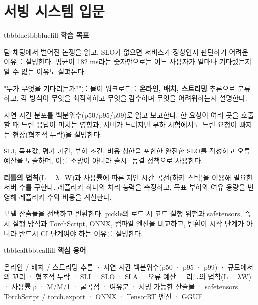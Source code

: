 \setcounter{chapter}{6}
\chapter{서빙 시스템 입문}

\begin{calloutbox}{tbbblue}{tbbbluefill}
{\normalsize\bfseries\color{tbbblue}학습 목표}\par\vspace{3pt}
\begin{tbbitemize}
  \item 팀 채팅에서 벌어진 논쟁을 읽고, SLO가 없으면 서비스가 정상인지 판단하기 어려운 이유를 설명한다. 평균이 182 ms라는 숫자만으로는 어느 사용자가 얼마나 기다렸는지 알 수 없는 이유도 살펴본다.
  \item "누가 무엇을 기다리는가?"를 물어 워크로드를 \textbf{온라인, 배치, 스트리밍} 추론으로 분류하고, 각 방식이 무엇을 최적화하고 무엇을 감수하며 무엇을 어려워하는지 설명한다.
  \item 지연 시간 분포를 백분위수(p50/p95/p99)로 읽고 보고한다. 한 요청이 여러 곳을 호출할 때 느린 응답이 미치는 영향과, 서버가 느려지면 부하 시험에서도 느린 요청이 빠지는 현상(협조적 누락)을 설명한다.
  \item SLI, 목표값, 평가 기간, 부하 조건, 비용 상한을 포함한 완전한 SLO를 작성하고 오류 예산을 도출하며, 이를 소망이 아니라 출시·동결 정책으로 사용한다.
  \item \textbf{리틀의 법칙}(L = λ·W)과 사용률에 따른 지연 시간 곡선(하키 스틱)을 이용해 필요한 서버 수를 구한다. 레플리카 하나의 처리 능력을 측정하고, 목표 부하와 여유 용량을 반영해 레플리카 수와 비용을 계산한다.
  \item 모델 산출물을 선택하고 변환한다. pickle의 로드 시 코드 실행 위험과 safetensors, 즉시 실행 방식과 TorchScript, ONNX, 컴파일 엔진을 비교하고, 변환이 시작 단계가 아니라 반드시 CI 단계여야 하는 이유를 설명한다.
\end{tbbitemize}
\end{calloutbox}

\vspace{3.5pt}

\begin{calloutbox}{tbbteal}{tbbtealfill}
{\normalsize\bfseries\color{tbbteal}핵심 용어}\par\vspace{3pt}
온라인 / 배치 / 스트리밍 추론 · 지연 시간 백분위수(p50 · p95 · p99) · 규모에서의 꼬리 · 협조적 누락 · SLI · SLO · SLA · 오류 예산 · 리틀의 법칙(L = λW) · 사용률 ρ · M/M/1 · 굴곡점 · 여유분 · 서빙 가능한 산출물 · safetensors · TorchScript / torch.export · ONNX · TensorRT 엔진 · GGUF
\end{calloutbox}

